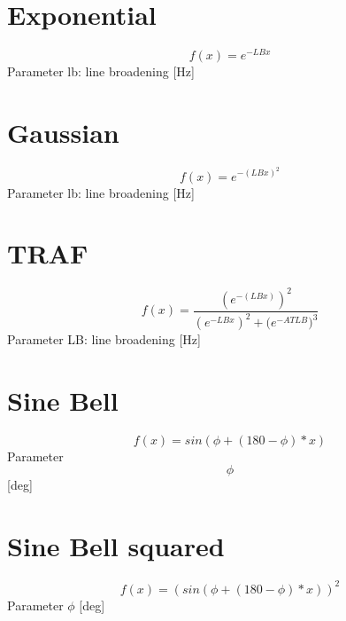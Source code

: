 \documentclass{article}
\begin{document}
\section{Exponential}
\begin{displaymath} 
f(x) = e^{-LB x}
\end{displaymath}
 Parameter lb: line broadening [Hz] 
\section{Gaussian}
\begin{displaymath}
f(x) = e^{-(LB x)^2}
\end{displaymath}
 Parameter lb: line broadening [Hz] 
\section{TRAF}


 \begin{displaymath}f(x) = \frac{(e^{-{(LB x)}})^2}{(e^{{-LB x}})^2 + {(e^{-AT LB}})^3}\end{displaymath}
 Parameter LB: line broadening [Hz] 
\section{Sine Bell}
 \begin{displaymath}f(x) = sin(\phi+(180-\phi)*x)\end{displaymath}
 Parameter \begin{displaymath}\phi\end{displaymath} [deg] 
\section{Sine Bell squared}
 \begin{displaymath}f(x) = (sin(\phi+(180-\phi)*x))^2\end{displaymath}
 Parameter $\phi$ [deg]
\end{document}
